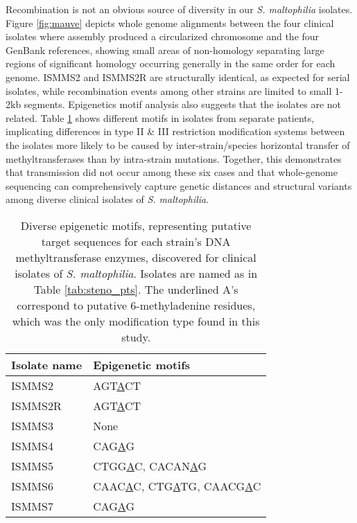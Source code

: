 Recombination is not an obvious source of diversity in our \emph{S. maltophilia} isolates. Figure \ref{fig:mauve} depicts whole genome alignments between the four clinical isolates where assembly produced a circularized chromosome and the four GenBank references, showing small areas of non-homology separating large regions of significant homology occurring generally in the same order for each genome. ISMMS2 and ISMMS2R are structurally identical, as expected for serial isolates, while recombination events among other strains are limited to small 1-2kb segments. Epigenetics motif analysis also suggests that the isolates are not related. Table \ref{tab:steno_epimotifs} shows different motifs in isolates from separate patients, implicating differences in type II \& III restriction modification systems between the isolates more likely to be caused by inter-strain/species horizontal transfer of methyltransferases than by intra-strain mutations.\autocite{Srikhanta2010} Together, this demonstrates that transmission did not occur among these six cases and that whole-genome sequencing can comprehensively capture genetic distances and structural variants among diverse clinical isolates of \emph{S. maltophilia}.

\begin{table}[ht]
  \centering
  \begin{tabular}{l l}
    \toprule
    Isolate name & Epigenetic motifs \\
    \midrule
    ISMMS2   & AGT\underline{A}CT \\
    ISMMS2R  & AGT\underline{A}CT \\
    ISMMS3   & None \\
    ISMMS4   & CAG\underline{A}G \\
    ISMMS5   & CTGG\underline{A}C, CACAN\underline{A}G \\
    ISMMS6   & CAAC\underline{A}C, CTG\underline{A}TG, CAACG\underline{A}C \\
    ISMMS7   & CAG\underline{A}G \\
    \bottomrule
  \end{tabular}
  \caption[Epigenetic motifs for clinical isolates of S. maltophilia]{Diverse epigenetic motifs, representing putative target sequences for each strain’s DNA methyltransferase enzymes, discovered for clinical isolates of \emph{S. maltophilia}.  Isolates are named as in Table \ref{tab:steno_pts}. The underlined A’s correspond to putative 6-methyladenine residues, which was the only modification type found in this study.}
  \label{tab:steno_epimotifs}
\end{table}

